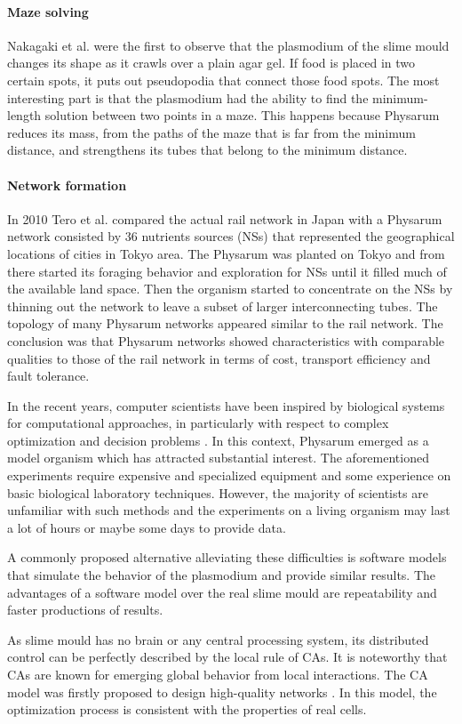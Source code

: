 \paragraph{Maze solving}
Nakagaki et al. \cite{nakagaki2000intelligence} were the first to observe that the plasmodium of the slime mould changes its shape as it crawls over a plain agar gel. If food is placed in two certain spots, it puts out pseudopodia that connect those food spots. The most interesting part is that the plasmodium had the ability to find the minimum-length solution between two points in a maze. This happens because Physarum reduces its mass, from the paths of the maze that is far from the minimum distance, and strengthens its tubes that belong to the minimum distance.
\paragraph{Network formation}
In 2010 Tero et al. \cite{Tero439} compared the actual rail network in Japan with a Physarum network consisted by 36 nutrients sources (NSs) that represented the geographical locations of cities in Tokyo area. The Physarum was planted on Tokyo and from there started its foraging behavior and exploration for NSs until it filled much of the available land space. Then the organism started to concentrate on the NSs by thinning out the network to leave a subset of larger interconnecting tubes. The topology of many Physarum networks appeared similar to the rail network. The conclusion was that Physarum networks showed characteristics with comparable qualities to those of the rail network in terms of cost, transport efficiency and fault tolerance.\\

\par
In the recent years, computer scientists have been inspired by biological systems for computational approaches, in particularly with respect to complex optimization and decision problems \cite{grube2016physarum}. In this context, Physarum emerged as a model organism which has attracted substantial interest. The aforementioned experiments require expensive and specialized equipment and some experience on basic biological laboratory techniques. However, the majority of scientists are unfamiliar with such methods and the experiments on a living organism may last a lot of hours or maybe some days to provide data.
\par
A commonly proposed alternative alleviating these difficulties is software models that simulate the behavior of the plasmodium and provide similar results. The advantages of a software model over the real slime mould are repeatability and faster productions of results.
\par
As slime mould has no brain or any central processing system, its distributed control can be perfectly described by the local rule of CAs. It is noteworthy that CAs are known for emerging global behavior from local interactions. The CA model was firstly proposed to design high-quality networks \cite{gunji2008minimal}. In this model, the optimization process is consistent with the properties of real cells. 
